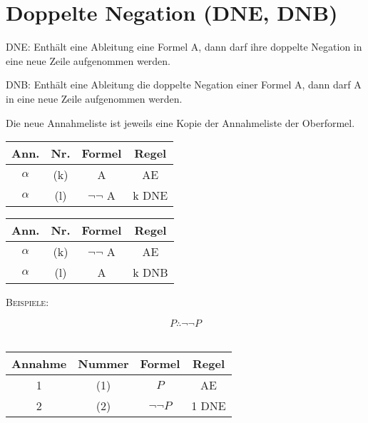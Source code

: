 \documentclass{sajzk}
\begin{document}
\section{Doppelte Negation (DNE, DNB)}
\label{is2y}
\textsc{DNE}: Enthält eine Ableitung eine Formel A, dann darf ihre doppelte
Negation in eine neue Zeile aufgenommen werden.

\textsc{DNB}: Enthält eine Ableitung die doppelte Negation einer Formel A, dann
darf A in eine neue Zeile aufgenommen werden.

Die neue Annahmeliste ist jeweils eine Kopie der Annahmeliste der Oberformel.

\begin{center}
  \begin{minipage}[t]{0.4\textwidth}
    \begin{tabular}{|c|c|c|c|}
      \hline
      Ann.               & Nr.    & Formel         & Regel \\
      \hline
      $\alpha$           & (k)    & A              & AE \\
      \hline
      $\alpha$           & (l)    & $\lnot\lnot$ A & k DNE \\
      \hline
    \end{tabular}
  \end{minipage}
  \begin{minipage}[t]{0.4\textwidth}
    \begin{tabular}{|c|c|c|c|}
      \hline
      Ann.               & Nr.    & Formel       & Regel \\
      \hline
      $\alpha$           & (k)    & $\lnot\lnot$ A & AE \\
      \hline
      $\alpha$           & (l)    & A              & k DNB \\
      \hline
    \end{tabular}
  \end{minipage}
\end{center}
\textsc{Beispiele:}
\begin{center}
    \[P \therefore \lnot\lnot P \] \\
\begin{tabular}{|c|c|c|c|}
  \hline
  Annahme            & Nummer & Formel         & Regel \\
  \hline
  1                  & (1)    & $P$            & AE \\
  \hline
  2                  & (2)    & $\lnot\lnot P$ & 1 DNE \\
  \hline
\end{tabular}
\end{center}
\end{document}
